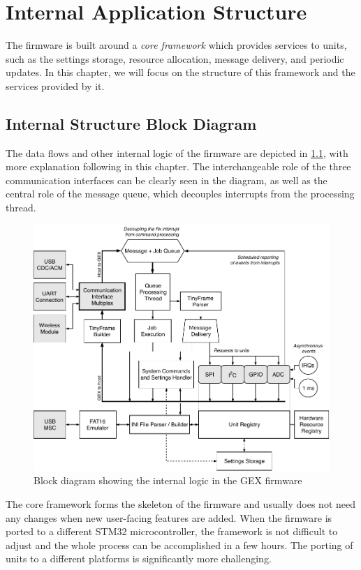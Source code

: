 \chapter{Internal Application Structure} \label{sec:coreframework}

The firmware is built around a \textit{core framework} which provides services to units, such as the settings storage, resource allocation, message delivery, and periodic updates. In this chapter, we will focus on the structure of this framework and the services provided by it.

\section{Internal Structure Block Diagram}

The data flows and other internal logic of the firmware are depicted in \cref{fig:gexinternal}, with more explanation following in this chapter. The interchangeable role of the three communication interfaces can be clearly seen in the diagram, as well as the central role of the message queue, which decouples interrupts from the processing thread.

\begin{figure}[h]
	\centering
	\includegraphics[width=\textwidth] {img/gex-internal.pdf}
	\caption{\label{fig:gexinternal}Block diagram showing the internal logic in the GEX firmware}
\end{figure}

The core framework forms the skeleton of the firmware and usually does not need any changes when new user-facing features are added. When the firmware is ported to a different STM32 microcontroller, the framework is not difficult to adjust and the whole process can be accomplished in a few hours. The porting of units to a different platforms is significantly more challenging.

